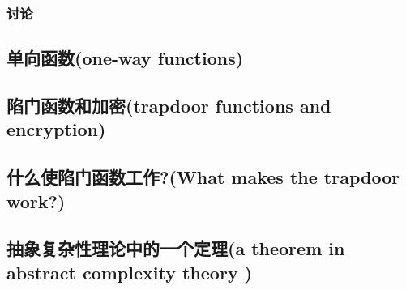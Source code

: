\documentclass[]{article}
\begin{document}
\subsubsection{讨论}

\subsection{单向函数(one-way functions)}

\subsection{陷门函数和加密(trapdoor functions and encryption)}

\subsection{什么使陷门函数工作?(What makes the trapdoor work?)}

\subsection{抽象复杂性理论中的一个定理(a theorem in abstract complexity theory )}
\end{document}
